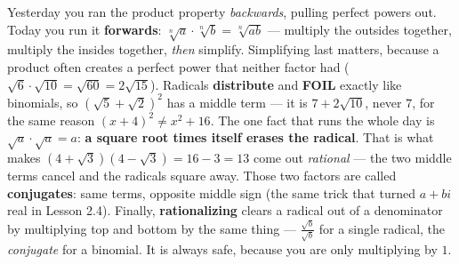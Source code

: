 \documentclass[10pt]{article}
\begin{document}
\vspace{0.10in}

\begin{remindbox}
\small Yesterday you ran the product property \emph{backwards}, pulling perfect powers out. Today
you run it \textbf{forwards}: $\sqrt[n]{a}\cdot\sqrt[n]{b}=\sqrt[n]{ab}$ --- multiply the outsides
together, multiply the insides together, \emph{then} simplify. Simplifying last matters, because a
product often creates a perfect power that neither factor had ($\sqrt6\cdot\sqrt{10}=\sqrt{60}
=2\sqrt{15}$). Radicals \textbf{distribute} and \textbf{FOIL} exactly like binomials, so
$\left(\sqrt5+\sqrt2\right)^{2}$ has a middle term --- it is $7+2\sqrt{10}$, never $7$, for the same
reason $(x+4)^{2}\ne x^{2}+16$. The one fact that runs the whole day is
$\sqrt{a}\cdot\sqrt{a}=a$: \textbf{a square root times itself erases the radical}. That is what makes
$\left(4+\sqrt3\right)\left(4-\sqrt3\right)=16-3=13$ come out \emph{rational} --- the two middle
terms cancel and the radicals square away. Those two factors are called \textbf{conjugates}: same
terms, opposite middle sign (the same trick that turned $a+bi$ real in Lesson 2.4). Finally,
\textbf{rationalizing} clears a radical out of a denominator by multiplying top and bottom by the
same thing --- $\frac{\sqrt b}{\sqrt b}$ for a single radical, the \emph{conjugate} for a binomial.
It is always safe, because you are only multiplying by $1$.
\end{remindbox}
\end{document}
